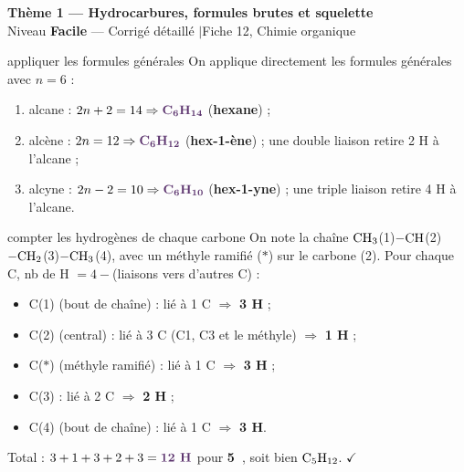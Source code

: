 \documentclass[11pt,a4paper]{article}
\newcommand{\rep}[1]{\textcolor{primarydark}{\textbf{#1}}}
\newcommand{\banner}[2]{%
\begin{tcolorbox}[enhanced,colback=excol,colframe=excol,arc=5pt,boxrule=0pt,
   left=5mm,right=5mm,top=2.5mm,bottom=2.5mm,coltext=white]
{\large\bfseries #1}\\[1pt]{\small #2}
\end{tcolorbox}\vspace{2pt}}
\begin{document}
\banner{Thème 1 — Hydrocarbures, formules brutes et squelette}{Niveau \textbf{Facile} — Corrigé détaillé \quad$\vert$\quad Fiche 12, Chimie organique}

\begin{corr}{appliquer les formules générales}
On applique directement les formules générales avec $n=6$ :
\begin{enumerate}[label=\textbf{\alph*)},leftmargin=2em,itemsep=1pt]
  \item alcane : $2n+2 = 14 \Rightarrow \rep{\ce{C6H14}}$ (\textbf{hexane}) ;
  \item alcène : $2n = 12 \Rightarrow \rep{\ce{C6H12}}$ (\textbf{hex-1-ène}) ; une double liaison retire 2 H à l'alcane ;
  \item alcyne : $2n-2 = 10 \Rightarrow \rep{\ce{C6H10}}$ (\textbf{hex-1-yne}) ; une triple liaison retire 4 H à l'alcane.
\end{enumerate}
\end{corr}

\begin{corr}{compter les hydrogènes de chaque carbone}
On note la chaîne $\ce{CH3}$(1)$-\ce{CH}$(2)$-\ce{CH2}$(3)$-\ce{CH3}$(4), avec un méthyle ramifié ($*$) sur le carbone (2). Pour chaque C, nb de H $=4-$(liaisons vers d'autres C) :
\begin{itemize}[leftmargin=1.6em,itemsep=1pt]
  \item C(1) (bout de chaîne) : lié à 1 C $\Rightarrow$ \rep{3 H} ;
  \item C(2) (central) : lié à 3 C (C1, C3 et le méthyle) $\Rightarrow$ \rep{1 H} ;
  \item C($*$) (méthyle ramifié) : lié à 1 C $\Rightarrow$ \rep{3 H} ;
  \item C(3) : lié à 2 C $\Rightarrow$ \rep{2 H} ;
  \item C(4) (bout de chaîne) : lié à 1 C $\Rightarrow$ \rep{3 H}.
\end{itemize}
Total : $3+1+3+2+3 = \rep{12\ \text{H}}$ pour \rep{5\ }, soit bien $\ce{C5H12}$. $\checkmark$
\end{corr}
\end{document}
